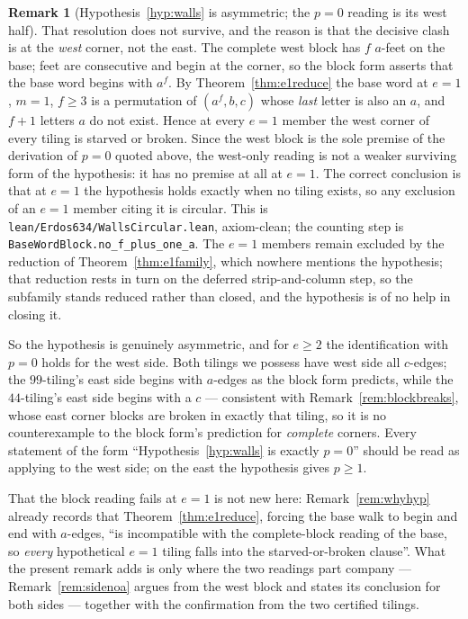 \documentclass[11pt,reqno]{amsart}
\theoremstyle{plain}
\theoremstyle{definition}
\newtheorem{remark}[theorem]{Remark}
\begin{document}
\begin{remark}[Hypothesis~\ref{hyp:walls} is asymmetric; the $p=0$ reading is its west half]
That resolution does not survive, and the reason is that the decisive clash is at the \emph{west}
corner, not the east. The complete west block has $f$ $a$-feet on the base; feet are consecutive and
begin at the corner, so the block form asserts that the base word begins with $a^f$. By
Theorem~\ref{thm:e1reduce} the base word at $e=1$, $m=1$, $f\ge3$ is a permutation of $(a^f,b,c)$
whose \emph{last} letter is also an $a$, and $f+1$ letters $a$ do not exist. Hence at every $e=1$
member the west corner of every tiling is starved or broken. Since the west block is the sole
premise of the derivation of $p=0$ quoted above, the west-only reading is not a weaker surviving
form of the hypothesis: it has no premise at all at $e=1$. The correct conclusion is that at $e=1$
the hypothesis holds exactly when no tiling exists, so any exclusion of an $e=1$ member citing it is
circular. This is \texttt{lean/Erdos634/WallsCircular.lean}, axiom-clean; the counting step is
\texttt{BaseWordBlock.no\_f\_plus\_one\_a}. The $e=1$ members remain excluded by the
reduction of Theorem~\ref{thm:e1family}, which nowhere mentions the hypothesis; that reduction
rests in turn on the deferred strip-and-column step, so the subfamily stands reduced rather than
closed, and the hypothesis is of no help in closing it.

So the hypothesis is genuinely asymmetric, and for $e\ge2$ the identification with $p=0$ holds for the west side.
Both tilings we possess have west side all $c$-edges; the $99$-tiling's east side begins with
$a$-edges as the block form predicts, while the $44$-tiling's east side begins with a $c$ ---
consistent with Remark~\ref{rem:blockbreaks}, whose east corner blocks are broken in exactly that
tiling, so it is no counterexample to the block form's prediction for \emph{complete} corners. Every
statement of the form ``Hypothesis~\ref{hyp:walls} is exactly $p=0$'' should be read as applying to the
west side; on the east the hypothesis gives $p\ge1$.

That the block reading fails at $e=1$ is not new here: Remark~\ref{rem:whyhyp} already records that
Theorem~\ref{thm:e1reduce}, forcing the base walk to begin and end with $a$-edges, ``is incompatible
with the complete-block reading of the base, so \emph{every} hypothetical $e=1$ tiling falls into the
starved-or-broken clause''. What the present remark adds is only where the two readings part company
--- Remark~\ref{rem:sidenoa} argues from the west block and states its conclusion for both sides ---
together with the confirmation from the two certified tilings.


\end{remark}
\end{document}
